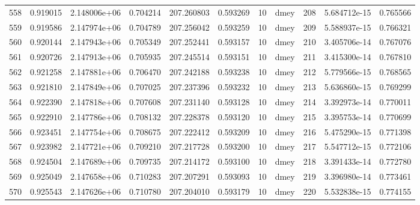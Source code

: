 \begin{tabular}{lrrrrrrlrrr}
558  &    0.919015 &        2.148006e+06 &  0.704214 &              207.260803 &    0.593269 &      10 &         dmey &    208 &   5.684712e-15 &      0.765566 \\
559  &    0.919586 &        2.147974e+06 &  0.704789 &              207.256042 &    0.593259 &      10 &         dmey &    209 &   5.588937e-15 &      0.766321 \\
560  &    0.920144 &        2.147943e+06 &  0.705349 &              207.252441 &    0.593157 &      10 &         dmey &    210 &   3.405706e-14 &      0.767076 \\
561  &    0.920726 &        2.147913e+06 &  0.705935 &              207.245514 &    0.593151 &      10 &         dmey &    211 &   3.415300e-14 &      0.767810 \\
562  &    0.921258 &        2.147881e+06 &  0.706470 &              207.242188 &    0.593238 &      10 &         dmey &    212 &   5.779566e-15 &      0.768565 \\
563  &    0.921810 &        2.147849e+06 &  0.707025 &              207.237396 &    0.593232 &      10 &         dmey &    213 &   5.636860e-15 &      0.769299 \\
564  &    0.922390 &        2.147818e+06 &  0.707608 &              207.231140 &    0.593128 &      10 &         dmey &    214 &   3.392973e-14 &      0.770011 \\
565  &    0.922910 &        2.147786e+06 &  0.708132 &              207.228378 &    0.593120 &      10 &         dmey &    215 &   3.395753e-14 &      0.770699 \\
566  &    0.923451 &        2.147754e+06 &  0.708675 &              207.222412 &    0.593209 &      10 &         dmey &    216 &   5.475290e-15 &      0.771398 \\
567  &    0.923982 &        2.147721e+06 &  0.709210 &              207.217728 &    0.593200 &      10 &         dmey &    217 &   5.547712e-15 &      0.772106 \\
568  &    0.924504 &        2.147689e+06 &  0.709735 &              207.214172 &    0.593100 &      10 &         dmey &    218 &   3.391433e-14 &      0.772780 \\
569  &    0.925049 &        2.147658e+06 &  0.710283 &              207.207291 &    0.593093 &      10 &         dmey &    219 &   3.396980e-14 &      0.773461 \\
570  &    0.925543 &        2.147626e+06 &  0.710780 &              207.204010 &    0.593179 &      10 &         dmey &    220 &   5.532838e-15 &      0.774155 \\

\end{tabular}
